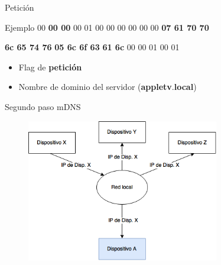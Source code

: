 \begin{frame}{Petición}
	\begin{exampleblock}{Ejemplo}
		 00 \textbf<2>{00 00} 00 01 00 00 \hspace{0.1cm} 00 00 00 00  \textbf<3>{07 61 70 70}
		
		\textbf<3> {6c 65 74 76} \textbf<4>{05 6c 6f 63} \hspace{0.1cm} \textbf<4>{61 6c} 00 00 01 00 01
		
	\end{exampleblock}
	
	\begin{itemize}
		\item<1-> Flag de \textbf<2->{petición}
		\item<1-> Nombre de dominio del servidor (\textbf<3>{appletv}.\textbf<4>{local})
	\end{itemize}
\end{frame}


\begin{frame}{Segundo paso mDNS}
	\begin{figure}[H]
		\centering
		\includegraphics[width=0.75\textwidth]{./Imagenes/mdns2.png}
		\label{fig:mdns2}
	\end{figure}
\end{frame}



